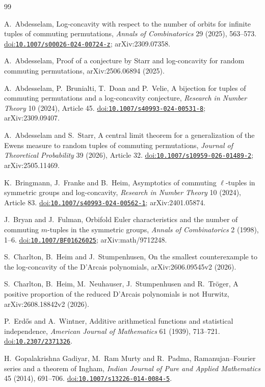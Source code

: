 \documentclass[11pt,a4paper]{article}
\theoremstyle{remark}
\numberwithin{equation}{section}
\newcommand{\doi}[1]{\href{https://doi.org/#1}{doi:\nolinkurl{#1}}}
\begin{document}
\begin{thebibliography}{99}\small

 A.~Abdesselam, Log-concavity with respect to the number of orbits for infinite tuples of commuting permutations, \emph{Annals of Combinatorics} 29 (2025), 563--573. \doi{10.1007/s00026-024-00724-z}; arXiv:2309.07358.

 A.~Abdesselam, Proof of a conjecture by Starr and log-concavity for random commuting permutations, arXiv:2506.06894 (2025).

 A.~Abdesselam, P.~Brunialti, T.~Doan and P.~Velie, A bijection for tuples of commuting permutations and a log-concavity conjecture, \emph{Research in Number Theory} 10 (2024), Article 45. \doi{10.1007/s40993-024-00531-8}; arXiv:2309.09407.

 A.~Abdesselam and S.~Starr, A central limit theorem for a generalization of the Ewens measure to random tuples of commuting permutations, \emph{Journal of Theoretical Probability} 39 (2026), Article 32. \doi{10.1007/s10959-026-01489-2}; arXiv:2505.11469.

 K.~Bringmann, J.~Franke and B.~Heim, Asymptotics of commuting $\ell$-tuples in symmetric groups and log-concavity, \emph{Research in Number Theory} 10 (2024), Article 83. \doi{10.1007/s40993-024-00562-1}; arXiv:2401.05874.

 J.~Bryan and J.~Fulman, Orbifold Euler characteristics and the number of commuting $m$-tuples in the symmetric groups, \emph{Annals of Combinatorics} 2 (1998), 1--6. \doi{10.1007/BF01626025}; arXiv:math/9712248.

 S.~Charlton, B.~Heim and J.~Stumpenhusen, On the smallest counterexample to the log-concavity of the D'Arcais polynomials, arXiv:2606.09545v2 (2026).

 S.~Charlton, B.~Heim, M.~Neuhauser, J.~Stumpenhusen and R.~Tr\"oger, A positive proportion of the reduced D'Arcais polynomials is not Hurwitz, arXiv:2608.18842v2 (2026).

 P.~Erd\H{o}s and A.~Wintner, Additive arithmetical functions and statistical independence, \emph{American Journal of Mathematics} 61 (1939), 713--721. \doi{10.2307/2371326}.

 H.~Gopalakrishna Gadiyar, M.~Ram Murty and R.~Padma, Ramanujan--Fourier series and a theorem of Ingham, \emph{Indian Journal of Pure and Applied Mathematics} 45 (2014), 691--706. \doi{10.1007/s13226-014-0084-5}.


\end{thebibliography}
\end{document}

